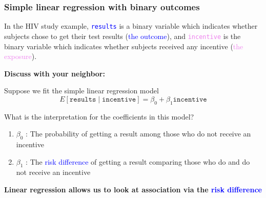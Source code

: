 \documentclass[10pt,t]{beamer}
\begin{document}
\begin{frame}
	\frametitle{Simple linear regression with binary outcomes}
	
	\vspace{-5 mm}
	
	In the HIV study example, \textcolor{blue}{\texttt{results}} is a binary variable which indicates whether subjects chose to get their test results (\textcolor{blue}{the outcome}), and \textcolor{violet}{\texttt{incentive}} is the binary variable which indicates whether subjects received any incentive (\textcolor{violet}{the exposure}).
	
	\medskip
	
	\textbf{Discuss with your neighbor:} 
	\medskip
	
	
	Suppose we fit the simple linear regression model $$E[\texttt{results} \mid \texttt{incentive}] = \beta_0 + \beta_1 \texttt{incentive}$$ 
	
	What is the interpretation for the coefficients in this model?
	\medskip
	
	\begin{enumerate}
		\item $\beta_0$ : {The probability of getting a result among those who do not receive an incentive}
		\medskip
		\item $\beta_1$ : {The \textcolor{blue}{risk difference} of getting a result comparing those who do and do not receive an incentive}
	\end{enumerate} 

\medskip
	\textbf{Linear regression allows us to look at association via the \textcolor{blue}{risk difference}}

\end{frame}
\end{document}
